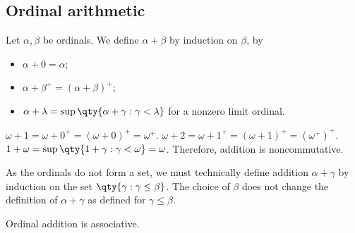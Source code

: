 \subsection{Ordinal arithmetic}
Let $\alpha, \beta$ be ordinals.
We define $\alpha + \beta$ by induction on $\beta$, by
\begin{itemize}
    \item $\alpha + 0 = \alpha$;
    \item $\alpha + \beta^+ = (\alpha + \beta)^+$;
    \item $\alpha + \lambda = \sup\qty{\alpha + \gamma : \gamma < \lambda}$ for a nonzero limit ordinal.
\end{itemize}
\begin{example}
    $\omega + 1 = \omega + 0^+ = (\omega + 0)^+ = \omega^+$.
    $\omega + 2 = \omega + 1^+ = (\omega + 1)^+ = (\omega^+)^+$.
    $1 + \omega = \sup\qty{1 + \gamma : \gamma < \omega} = \omega$.
    Therefore, addition is noncommutative.
\end{example}
\begin{remark}
    As the ordinals do not form a set, we must technically define addition $\alpha + \gamma$ by induction on the set $\qty{\gamma : \gamma \leq \beta}$.
    The choice of $\beta$ does not change the definition of $\alpha + \gamma$ as defined for $\gamma \leq \beta$.
\end{remark}
\begin{proposition}
    Ordinal addition is associative.
\end{proposition}
